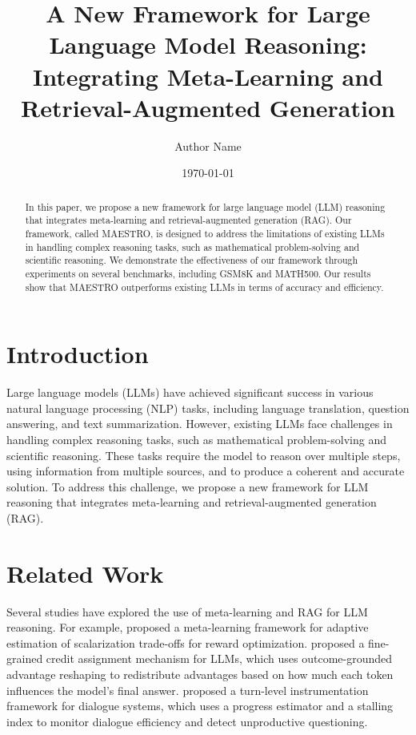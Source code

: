 \documentclass{article}
\begin{document}
\title{A New Framework for Large Language Model Reasoning: Integrating Meta-Learning and Retrieval-Augmented Generation}
\author{Author Name}
\date{\today}

\maketitle

\begin{abstract}
In this paper, we propose a new framework for large language model (LLM) reasoning that integrates meta-learning and retrieval-augmented generation (RAG). Our framework, called MAESTRO, is designed to address the limitations of existing LLMs in handling complex reasoning tasks, such as mathematical problem-solving and scientific reasoning. We demonstrate the effectiveness of our framework through experiments on several benchmarks, including GSM8K and MATH500. Our results show that MAESTRO outperforms existing LLMs in terms of accuracy and efficiency.
\end{abstract}

\section{Introduction}
Large language models (LLMs) have achieved significant success in various natural language processing (NLP) tasks, including language translation, question answering, and text summarization. However, existing LLMs face challenges in handling complex reasoning tasks, such as mathematical problem-solving and scientific reasoning. These tasks require the model to reason over multiple steps, using information from multiple sources, and to produce a coherent and accurate solution. To address this challenge, we propose a new framework for LLM reasoning that integrates meta-learning and retrieval-augmented generation (RAG).

\section{Related Work}
Several studies have explored the use of meta-learning and RAG for LLM reasoning. For example, \citet{zhao2026maestrometalearningadaptiveestimation} proposed a meta-learning framework for adaptive estimation of scalarization trade-offs for reward optimization. \citet{li2026outcomegroundedadvantagereshapingfinegrained} proposed a fine-grained credit assignment mechanism for LLMs, which uses outcome-grounded advantage reshaping to redistribute advantages based on how much each token influences the model's final answer. \citet{panagopoulos2026dialoguetelemetryturnlevelinstrumentation} proposed a turn-level instrumentation framework for dialogue systems, which uses a progress estimator and a stalling index to monitor dialogue efficiency and detect unproductive questioning.
\end{document}
